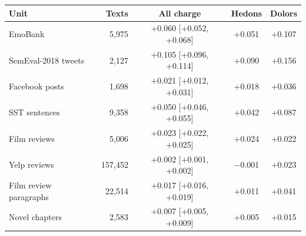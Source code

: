 \begin{tabular}{@{}lrccc@{}}
\toprule
Unit & Texts & All charge & Hedons & Dolors \\
\midrule
EmoBank & 5,975 & +0.060 [+0.052, +0.068] & +0.051 & +0.107 \\
SemEval-2018 tweets & 2,127 & +0.105 [+0.096, +0.114] & +0.090 & +0.156 \\
Facebook posts & 1,698 & +0.021 [+0.012, +0.031] & +0.018 & +0.036 \\
SST sentences & 9,358 & +0.050 [+0.046, +0.055] & +0.042 & +0.087 \\
Film reviews & 5,006 & +0.023 [+0.022, +0.025] & +0.024 & +0.022 \\
Yelp reviews & 157,452 & +0.002 [+0.001, +0.002] & \ensuremath{-}0.001 & +0.023 \\
Film review paragraphs & 22,514 & +0.017 [+0.016, +0.019] & +0.011 & +0.041 \\
Novel chapters & 2,583 & +0.007 [+0.005, +0.009] & +0.005 & +0.015 \\
\bottomrule
\end{tabular}
